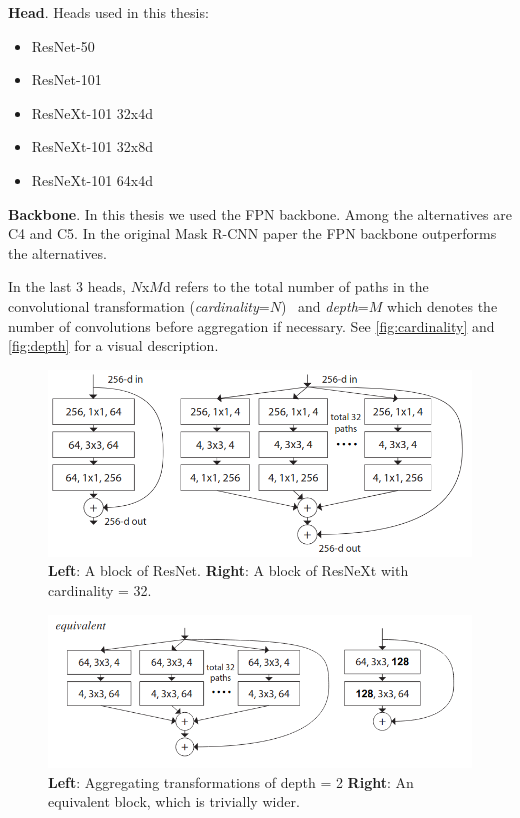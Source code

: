 \documentclass[oneside, english, bibtex]{kththesis}
\begin{document}
\textbf{Head}. Heads used in this thesis:

\begin{itemize}
\item ResNet-50
\item ResNet-101
\item ResNeXt-101 32x4d 
\item ResNeXt-101 32x8d
\item ResNeXt-101 64x4d
\end{itemize}


\textbf{Backbone}. In this thesis we used the FPN backbone. Among the alternatives are C4 and C5. In the original Mask R-CNN paper the FPN backbone outperforms the alternatives. 


In the last 3 heads, $N$x$M$d refers to the total number of paths in the convolutional transformation (\textit{cardinality}=$N$)~\cite{DBLP:journals/corr/XieGDTH16} and \textit{depth}=$M$ which denotes the number of convolutions before aggregation if necessary. See \autoref{fig:cardinality} and \autoref{fig:depth} for a visual description.

\begin{figure}[H]
  \begin{center}
    \includegraphics[width=1.0\textwidth]{figures/resnext-cardinality.png}
  \end{center}
  \caption{\textbf{Left}: A block of ResNet. \textbf{Right}: A block of ResNeXt with cardinality = 32. ~\cite{DBLP:journals/corr/XieGDTH16}}
  \label{fig:cardinality}
\end{figure}

\begin{figure}[H]
  \begin{center}
    \includegraphics[width=1.0\textwidth]{figures/resnext-depth.png}
  \end{center}
  \caption{\textbf{Left}: Aggregating transformations of depth = 2 \textbf{Right}: An equivalent block, which is trivially wider.~\cite{DBLP:journals/corr/XieGDTH16}}
  \label{fig:depth}
\end{figure}
\end{document}
